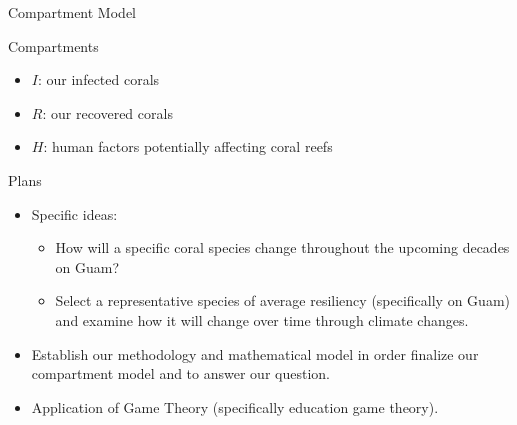 \documentclass{beamer}
\begin{document}
\begin{frame}{Compartment Model}
\begin{block}{Compartments }
\begin{itemize}
    \item $I$: our infected corals
    \item $R$: our recovered corals
    \item $H$: human factors potentially affecting coral reefs
\end{itemize}
\end{block}
\end{frame}

\begin{frame}{Plans}
    \begin{itemize}
        \item Specific ideas:
        \begin{itemize}
            \item How will a specific coral species change throughout the upcoming decades on Guam?
            \item Select a representative species of average resiliency (specifically on Guam) and examine how it will change over time through climate changes.
        \end{itemize}
        \item Establish our methodology and mathematical model in order finalize our compartment model and to answer our question.
        \item Application of Game Theory (specifically education game theory).
    \end{itemize}
\end{frame}



\end{document}
